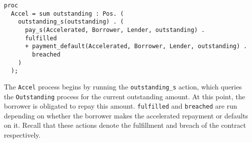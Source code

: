 \documentclass{article}
\begin{document}
\begin{lstlisting}
proc
  Accel = sum outstanding : Pos. (
    outstanding_s(outstanding) . (
      pay_s(Accelerated, Borrower, Lender, outstanding) .
      fulfilled
      + payment_default(Accelerated, Borrower, Lender, outstanding) .
        breached
    )
  );
\end{lstlisting}

The \texttt{Accel} process begins by running the \texttt{outstanding\_s} action,
which queries the \texttt{Outstanding} process for the current outstanding
amount. 
At this point, the borrower is obligated to repay this amount.
\texttt{fulfilled} and \texttt{breached} are run depending on whether the
borrower makes the accelerated repayment or defaults on it.
Recall that these actions denote the fulfillment and breach of the contract
respectively.






\end{document}
